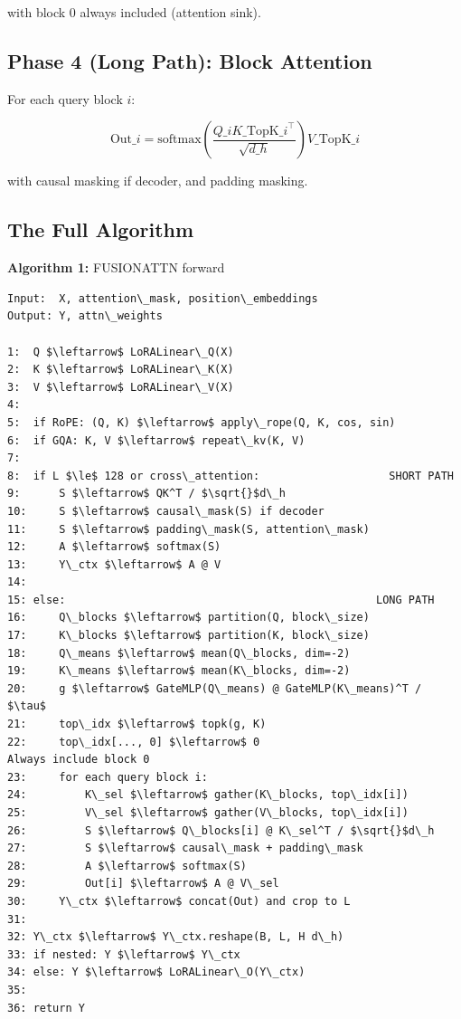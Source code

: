 with block 0 always included (attention sink).

\subsection{Phase 4 (Long Path): Block Attention}

For each query block $i$:

\[
\text{Out}\_i = \text{softmax}\!\left(\frac{Q\_i K\_{\text{TopK}\_i}^\top}{\sqrt{d\_h}}\right) V\_{\text{TopK}\_i}
\tag{4.8}
\]

with causal masking if decoder, and padding masking.

\subsection{The Full Algorithm}

\textbf{Algorithm 1:} FUSIONATTN forward
\begin{lstlisting}
Input:  X, attention\_mask, position\_embeddings
Output: Y, attn\_weights

1:  Q $\leftarrow$ LoRALinear\_Q(X)
2:  K $\leftarrow$ LoRALinear\_K(X)
3:  V $\leftarrow$ LoRALinear\_V(X)
4:
5:  if RoPE: (Q, K) $\leftarrow$ apply\_rope(Q, K, cos, sin)
6:  if GQA: K, V $\leftarrow$ repeat\_kv(K, V)
7:
8:  if L $\le$ 128 or cross\_attention:                    SHORT PATH
9:      S $\leftarrow$ QK^T / $\sqrt{}$d\_h
10:     S $\leftarrow$ causal\_mask(S) if decoder
11:     S $\leftarrow$ padding\_mask(S, attention\_mask)
12:     A $\leftarrow$ softmax(S)
13:     Y\_ctx $\leftarrow$ A @ V
14:
15: else:                                                LONG PATH
16:     Q\_blocks $\leftarrow$ partition(Q, block\_size)
17:     K\_blocks $\leftarrow$ partition(K, block\_size)
18:     Q\_means $\leftarrow$ mean(Q\_blocks, dim=-2)
19:     K\_means $\leftarrow$ mean(K\_blocks, dim=-2)
20:     g $\leftarrow$ GateMLP(Q\_means) @ GateMLP(K\_means)^T / $\tau$
21:     top\_idx $\leftarrow$ topk(g, K)
22:     top\_idx[..., 0] $\leftarrow$ 0                            Always include block 0
23:     for each query block i:
24:         K\_sel $\leftarrow$ gather(K\_blocks, top\_idx[i])
25:         V\_sel $\leftarrow$ gather(V\_blocks, top\_idx[i])
26:         S $\leftarrow$ Q\_blocks[i] @ K\_sel^T / $\sqrt{}$d\_h
27:         S $\leftarrow$ causal\_mask + padding\_mask
28:         A $\leftarrow$ softmax(S)
29:         Out[i] $\leftarrow$ A @ V\_sel
30:     Y\_ctx $\leftarrow$ concat(Out) and crop to L
31:
32: Y\_ctx $\leftarrow$ Y\_ctx.reshape(B, L, H d\_h)
33: if nested: Y $\leftarrow$ Y\_ctx
34: else: Y $\leftarrow$ LoRALinear\_O(Y\_ctx)
35:
36: return Y
\end{lstlisting}

